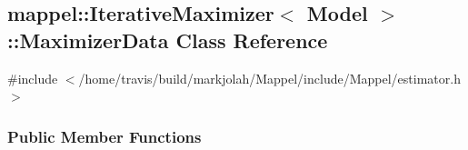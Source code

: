 \hypertarget{classmappel_1_1IterativeMaximizer_1_1MaximizerData}{}\subsection{mappel\+:\+:Iterative\+Maximizer$<$ Model $>$\+:\+:Maximizer\+Data Class Reference}
\label{classmappel_1_1IterativeMaximizer_1_1MaximizerData}


{\ttfamily \#include $<$/home/travis/build/markjolah/\+Mappel/include/\+Mappel/estimator.\+h$>$}

\subsubsection*{Public Member Functions}
